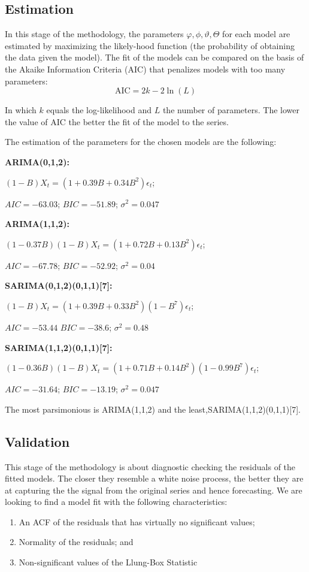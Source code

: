 \subsection{Estimation}
In this stage of the methodology, the parameters $\varphi, \phi, \vartheta,\Theta$ for each model are estimated by maximizing the likely-hood function (the probability of obtaining the data given the model). The fit of the models can be compared on the basis of the Akaike Information Criteria (AIC) that penalizes models with too many parameters:
$$\mathrm{AIC} = 2k - 2\ln(L) $$

In which $k$ equals the log-likelihood and $L$ the number of parameters. The lower the value of AIC the better the fit of the model to the series. 

The estimation of the parameters for the chosen models are the following: 

{\bf ARIMA(0,1,2):}

$(1-B)X_t=(1+0.39B +0.34B^2)\epsilon_t$; 

$AIC=-63.03 $; $BIC=-51.89$; $\sigma^2=0.047$

{\bf ARIMA(1,1,2):}

$(1-0.37B)(1-B)X_t=(1+0.72B +0.13B^2)\epsilon_t$; 

$AIC=-67.78$; $BIC=-52.92$; $\sigma^2=0.04$
 
{\bf SARIMA(0,1,2)(0,1,1)[7]:}

$(1-B)X_t=(1+0.39B +0.33B^2)(1-B^7)\epsilon_t$; 

$AIC=-53.44  $
$BIC=-38.6$; $\sigma^2=0.48$

{\bf SARIMA(1,1,2)(0,1,1)[7]:}

$(1-0.36B)(1-B)X_t=(1+0.71B +0.14B^2)(1-0.99B^7)\epsilon_t$; 

$AIC=-31.64$; $BIC=-13.19$; $\sigma^2=0.047$

The most parsimonious is ARIMA(1,1,2) and the least,SARIMA(1,1,2)(0,1,1)[7].
\subsection{Validation}
This stage of the methodology is about diagnostic checking the residuals of the fitted models. The closer they resemble a white noise process, the better they are at capturing the the signal from the original series and hence forecasting. We are looking to find a model fit with the following characteristics:
\begin{enumerate}
\item An ACF of the residuals that has virtually no significant values;
\item Normality of the residuals; and
\item Non-significant values of the Llung-Box Statistic
\end{enumerate}

